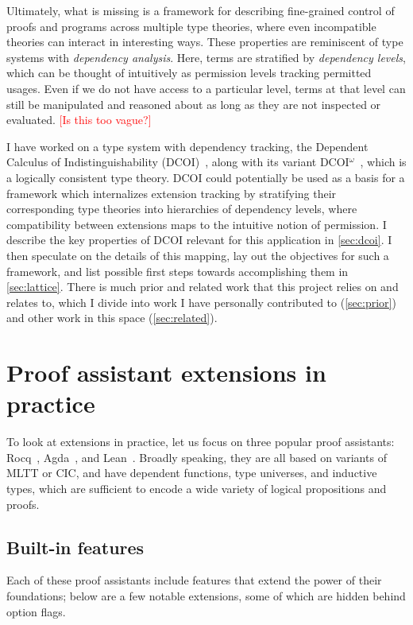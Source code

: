 \documentclass{article}
\newcommand{\note}[1]{\textcolor{red}{[#1]}}
\begin{document}
Ultimately, what is missing is a framework for describing
fine-grained control of proofs and programs across multiple type theories,
where even incompatible theories can interact in interesting ways.
These properties are reminiscent of type systems with \emph{dependency analysis}.
Here, terms are stratified by \emph{dependency levels},
which can be thought of intuitively as permission levels tracking permitted usages.
Even if we do not have access to a particular level,
terms at that level can still be manipulated and reasoned about
as long as they are not inspected or evaluated.
\note{Is this too vague?}

I have worked on a type system with dependency tracking,
the Dependent Calculus of Indistinguishability (DCOI)~\citep{dcoi},
along with its variant DCOI$^\omega$~\citep{dcoi-omega},
which is a logically consistent type theory.
DCOI could potentially be used as a basis for a framework
which internalizes extension tracking by stratifying
their corresponding type theories into hierarchies of dependency levels,
where compatibility between extensions maps to the intuitive notion of permission.
I describe the key properties of DCOI relevant for this application in \cref{sec:dcoi}.
I then speculate on the details of this mapping,
lay out the objectives for such a framework,
and list possible first steps towards accomplishing them in \cref{sec:lattice}.
There is much prior and related work that this project relies on and relates to,
which I divide into work I have personally contributed to (\cref{sec:prior})
and other work in this space (\cref{sec:related}).

\section{Proof assistant extensions in practice} \label{sec:extensions}

To look at extensions in practice,
let us focus on three popular proof assistants:
Rocq~\citep{coq}, Agda~\citep{agda}, and Lean~\citep{lean}.
Broadly speaking, they are all based on variants of MLTT or CIC,
and have dependent functions, type universes, and inductive types,
which are sufficient to encode a wide variety of logical propositions and proofs.

\subsection{Built-in features}

Each of these proof assistants include features that extend the power of their foundations;
below are a few notable extensions,
some of which are hidden behind option flags.
\end{document}
